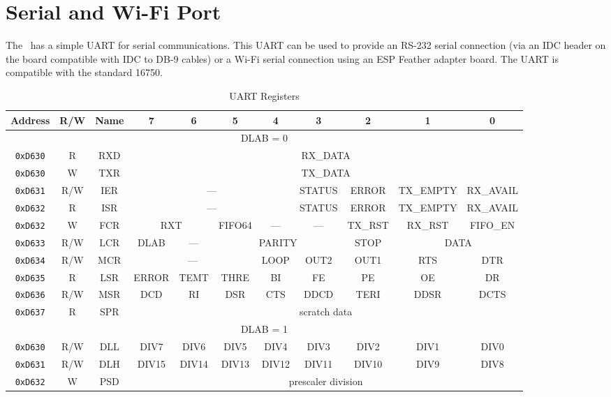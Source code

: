 \chapter{Serial and Wi-Fi Port}

The \jr\ has a simple UART for serial communications. This UART can be used to provide an RS-232 serial connection (via an IDC header on the board compatible with IDC to DB-9 cables) or a Wi-Fi serial connection using an ESP Feather adapter board. The UART is compatible with the standard 16750.

\begin{table}[h]
    \begin{center}
        \begin{tabular}{|c|c|c|c|c|c|c|c|c|c|c|} \hline
            Address & R/W & Name & 7 & 6 & 5 & 4 & 3 & 2 & 1 & 0 \\\hline\hline
            \multicolumn{11}{|c|}{DLAB = 0} \\ \hline
            \verb+0xD630+ & R & RXD & \multicolumn{8}{|c|}{RX\_DATA} \\ \hline
            \verb+0xD630+ & W & TXR & \multicolumn{8}{|c|}{TX\_DATA} \\ \hline
            \verb+0xD631+ & R/W & IER & \multicolumn{4}{|c|}{---} & STATUS & ERROR & TX\_EMPTY & RX\_AVAIL \\ \hline
            \verb+0xD632+ & R & ISR & \multicolumn{4}{|c|}{---} & STATUS & ERROR & TX\_EMPTY & RX\_AVAIL \\ \hline
            \verb+0xD632+ & W & FCR & \multicolumn{2}{|c|}{RXT} & FIFO64 & --- & --- & TX\_RST & RX\_RST & FIFO\_EN \\ \hline
            \verb+0xD633+ & R/W & LCR & DLAB & --- & \multicolumn{3}{|c|}{PARITY} & STOP & \multicolumn{2}{|c|}{DATA} \\ \hline
            \verb+0xD634+ & R/W & MCR & \multicolumn{3}{|c|}{---} & LOOP & OUT2 & OUT1 & RTS & DTR \\ \hline
            \verb+0xD635+ & R & LSR & ERROR & TEMT & THRE & BI & FE & PE & OE & DR \\ \hline
            \verb+0xD636+ & R/W & MSR & DCD & RI & DSR & CTS & DDCD & TERI & DDSR & DCTS \\ \hline
            \verb+0xD637+ & R & SPR & \multicolumn{8}{|c|}{scratch data} \\ \hline\hline

            \multicolumn{11}{|c|}{DLAB = 1} \\ \hline
            \verb+0xD630+ & R/W & DLL & DIV7 & DIV6 & DIV5 & DIV4 & DIV3 & DIV2 & DIV1 & DIV0 \\ \hline
            \verb+0xD631+ & R/W & DLH & DIV15 & DIV14 & DIV13 & DIV12 & DIV11 & DIV10 & DIV9 & DIV8 \\ \hline
            \verb+0xD632+ & W & PSD & \multicolumn{8}{|c|}{prescaler division} \\ \hline
        \end{tabular}
    \end{center}
    \caption{UART Registers}
    \label{tab:uart_reg}
\end{table}

